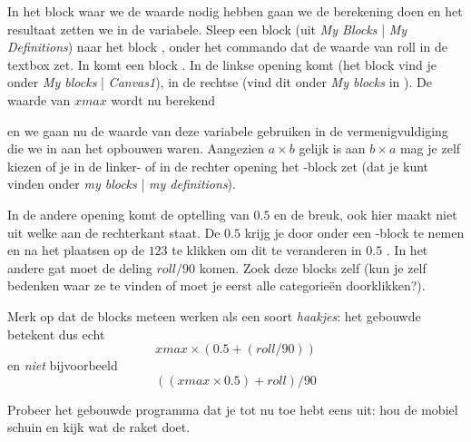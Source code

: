 In het block waar we de waarde nodig hebben gaan we de berekening doen en het resultaat zetten we in de variabele. Sleep een block  (uit \emph{My Blocks} | \emph{My Definitions}) naar het block  
\linebreak {}, onder het commando dat de waarde van roll in de textbox zet. 
In  komt een block \block{-}. 
In de linkse opening komt  (het block vind je onder \emph{My blocks} | \emph{Canvas1}), in de rechtse 
\linebreak {} (vind dit onder \emph{My blocks} in 
\linebreak {}). De waarde van $xmax$ wordt nu berekend



en we gaan nu de waarde van deze variabele gebruiken in de vermenigvuldiging die we in  
\linebreak {} aan het opbouwen waren. Aangezien $a \times b$ gelijk is aan $b \times a$ mag je zelf kiezen of je in de linker- of in de rechter opening het -block zet (dat je kunt vinden onder \emph{my blocks} | \emph{my definitions}). 

In de andere opening komt de optelling van $0.5$ en de breuk, ook hier maakt niet uit welke aan de rechterkant staat. De $0.5$ krijg je door onder  een 
\linebreak {}-block te nemen en na het plaatsen op de $123$ te klikken om dit te veranderen in $0.5$ . 
In het andere gat moet de deling $ roll/90 $ komen. Zoek deze blocks zelf (kun je zelf bedenken waar ze te vinden of moet je eerst alle categorie\"en doorklikken?). 




Merk op dat de blocks meteen werken als een soort \emph{haakjes}: het gebouwde betekent dus echt
\[
	xmax \times (0.5 + (roll/90))
\]
en \emph{niet} bijvoorbeeld
\[
	((xmax \times 0.5) + roll)/90  
\]

\runOpTelefoon{}
Probeer het gebouwde programma dat je tot nu toe hebt eens uit: hou de mobiel schuin en kijk  wat de raket doet. 

